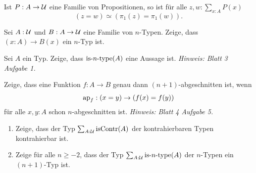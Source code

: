 \documentclass{hott-übung}
\begin{document}
\setcounter{blattnummer}{5}
\setcounter{aufgabennummer}{0}

\blatt

\aufgabe{}
Ist \(P : A \to \mathcal{U}\) eine Familie von Propositionen, so ist für alle \(z,w : \sum_{x : A}P(x)\)
\[(z = w) \simeq (\pi_1(z) = \pi_1(w)).\]

\vspace{-1em}

\aufgabe{}
Sei \(A:\mathcal{U}\) und \(B : A \to \mathcal{U}\) eine Familie von \(n\)-Typen.
Zeige, dass $(x:A)\to B(x)$ ein $n$-Typ ist.
  
\aufgabe{}
Sei $A$ ein Typ. Zeige, dass \(\mathrm{is}\mbox{-}{n}\mbox{-}\mathrm{type}(A)\) eine Aussage ist.
\emph{Hinweis: Blatt 3 Aufgabe 1.}

\aufgabe{}
Zeige, dass eine Funktion \(f : A \to B\) genau dann \((n+1)\)-abgeschnitten ist, wenn
\[\mathrm{ap}_f : (x=y) \to (f(x) = f(y))\]
für alle \(x,y : A\) schon \(n\)-abgeschnitten ist.
\emph{Hinweis: Blatt 4 Aufgabe 5.}

\aufgabe{}
  \begin{enumerate}
    \item Zeige, dass der Typ \(\sum_{A:\mathcal{U}}\mathrm{isContr}(A)\) der kontrahierbaren Typen kontrahierbar ist.
    \item Zeige für alle \(n \geq -2\), dass der Typ \(\sum_{A:\mathcal{U}}\mathrm{is}\mbox{-}{n}\mbox{-}\mathrm{type}(A)\) der \(n\)-Typen ein \((n+1)\)-Typ ist.
  \end{enumerate}
\end{document}
